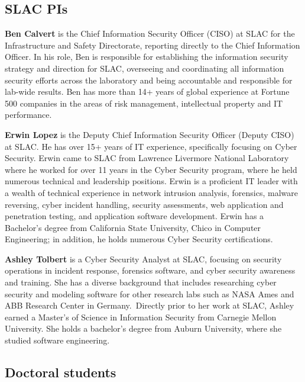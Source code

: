 \documentclass[10pt]{article}
\newcommand{\slim}{\vspace{0.5\baselineskip}}
\begin{document}
\subsection{SLAC PIs}

\noindent \textbf{Ben Calvert} is the Chief Information Security
Officer (CISO) at SLAC for the Infrastructure and Safety Directorate,
reporting directly to the Chief Information Officer. In his role, Ben
is responsible for establishing the information security strategy and
direction for SLAC, overseeing and coordinating all information
security efforts across the laboratory and being accountable and
responsible for lab-wide results. Ben has more than 14+ years of
global experience at Fortune 500 companies in the areas of risk
management, intellectual property and IT performance.

\slim

\noindent \textbf{Erwin Lopez} is the Deputy Chief Information
Security Officer (Deputy CISO) at SLAC. He has over 15+ years of IT
experience, specifically focusing on Cyber Security. Erwin came to
SLAC from Lawrence Livermore National Laboratory where he worked for
over 11 years in the Cyber Security program, where he held numerous
technical and leadership positions. Erwin is a proficient IT leader
with a wealth of technical experience in network intrusion analysis,
forensics, malware reversing, cyber incident handling, security
assessments, web application and penetration testing, and application
software development. Erwin has a Bachelor's degree from California
State University, Chico in Computer Engineering; in addition, he holds
numerous Cyber Security certifications.

\slim

\noindent \textbf{Ashley Tolbert} is a Cyber Security Analyst at SLAC,
focusing on security operations in incident response, forensics
software, and cyber security awareness and training. She has a diverse
background that includes researching cyber security and modeling
software for other research labs such as NASA Ames and ABB Research
Center in Germany. Directly prior to her work at SLAC, Ashley earned a
Master's of Science in Information Security from Carnegie Mellon
University. She holds a bachelor’s degree from Auburn University,
where she studied software engineering.  \slim

\subsection{Doctoral students}
\end{document}
